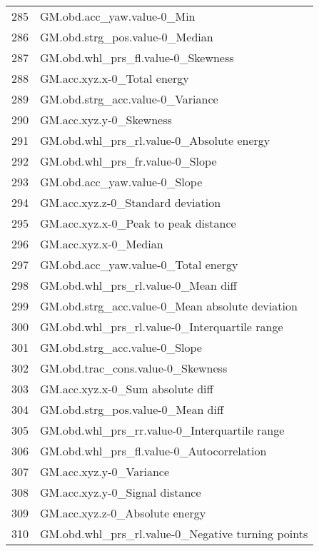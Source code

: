 \begin{tabular}{ll}
285 &                         GM.obd.acc\_yaw.value-0\_Min \\
286 &                     GM.obd.strg\_pos.value-0\_Median \\
287 &                 GM.obd.whl\_prs\_fl.value-0\_Skewness \\
288 &                        GM.acc.xyz.x-0\_Total energy \\
289 &                   GM.obd.strg\_acc.value-0\_Variance \\
290 &                            GM.acc.xyz.y-0\_Skewness \\
291 &          GM.obd.whl\_prs\_rl.value-0\_Absolute energy \\
292 &                    GM.obd.whl\_prs\_fr.value-0\_Slope \\
293 &                       GM.obd.acc\_yaw.value-0\_Slope \\
294 &                  GM.acc.xyz.z-0\_Standard deviation \\
295 &               GM.acc.xyz.x-0\_Peak to peak distance \\
296 &                              GM.acc.xyz.x-0\_Median \\
297 &                GM.obd.acc\_yaw.value-0\_Total energy \\
298 &                GM.obd.whl\_prs\_rl.value-0\_Mean diff \\
299 &    GM.obd.strg\_acc.value-0\_Mean absolute deviation \\
300 &      GM.obd.whl\_prs\_rl.value-0\_Interquartile range \\
301 &                      GM.obd.strg\_acc.value-0\_Slope \\
302 &                  GM.obd.trac\_cons.value-0\_Skewness \\
303 &                   GM.acc.xyz.x-0\_Sum absolute diff \\
304 &                  GM.obd.strg\_pos.value-0\_Mean diff \\
305 &      GM.obd.whl\_prs\_rr.value-0\_Interquartile range \\
306 &          GM.obd.whl\_prs\_fl.value-0\_Autocorrelation \\
307 &                            GM.acc.xyz.y-0\_Variance \\
308 &                     GM.acc.xyz.y-0\_Signal distance \\
309 &                     GM.acc.xyz.z-0\_Absolute energy \\
310 &  GM.obd.whl\_prs\_rl.value-0\_Negative turning points \\

\end{tabular}
